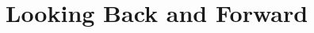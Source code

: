 \renewcommand\todo[1]{{\todocolor\ensuretext{\bfseries\sffamily{#1}}}}

\chapter{Looking Back and Forward}
\label{chapter-conclusion}








